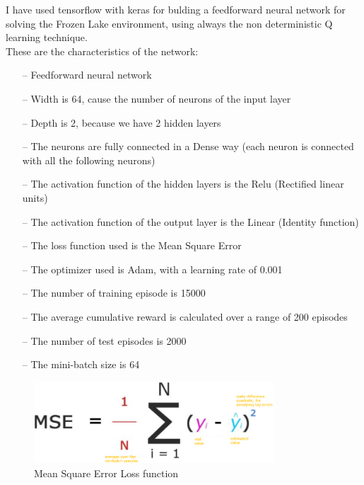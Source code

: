 \documentclass{article}
\begin{document}
I have used tensorflow with keras for bulding a feedforward neural network for solving the Frozen Lake environment, using always the non deterministic Q learning technique.
\\
These are the characteristics of the network:
\begin{itemize}
\item[--] Feedforward neural network
\item[--] Width is 64, cause the number of neurons of the input layer
\item[--] Depth is 2, because we have 2 hidden layers
\item[--] The neurons are fully connected in a Dense way (each neuron is connected with all the following neurons)
\item[--] The activation function of the hidden layers is the Relu (Rectified linear units)
\item[--] The activation function of the output layer is the Linear (Identity function)
\item[--] The loss function used is the Mean Square Error
\item[--] The optimizer used is Adam, with a learning rate of 0.001
\item[--] The number of training episode is 15000
\item[--] The average cumulative reward is calculated over a range of 200 episodes
\item[--] The number of test episodes is 2000
\item[--] The mini-batch size is 64
\end{itemize}


\begin{figure}[h]
    \centering
    \includegraphics[width=0.8\textwidth]{Mean_square_error_function.png}
    \caption{Mean Square Error Loss function}
    \label{mse_loss:}

\end{figure}

\clearpage
\end{document}

